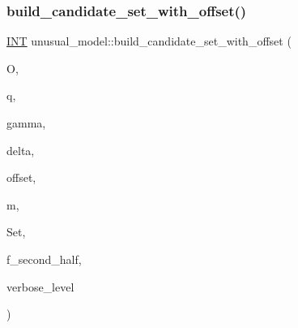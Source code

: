 \subsubsection{\texorpdfstring{build\+\_\+candidate\+\_\+set\+\_\+with\+\_\+offset()}{build\_candidate\_set\_with\_offset()}}
{\footnotesize\ttfamily \mbox{\hyperlink{galois_8h_a09fddde158a3a20bd2dcadb609de11dc}{I\+NT}} unusual\+\_\+model\+::build\+\_\+candidate\+\_\+set\+\_\+with\+\_\+offset (\begin{DoxyParamCaption}\item[{\mbox{\hyperlink{classorthogonal}{orthogonal}} \&}]{O,  }\item[{\mbox{\hyperlink{galois_8h_a09fddde158a3a20bd2dcadb609de11dc}{I\+NT}}}]{q,  }\item[{\mbox{\hyperlink{galois_8h_a09fddde158a3a20bd2dcadb609de11dc}{I\+NT}}}]{gamma,  }\item[{\mbox{\hyperlink{galois_8h_a09fddde158a3a20bd2dcadb609de11dc}{I\+NT}}}]{delta,  }\item[{\mbox{\hyperlink{galois_8h_a09fddde158a3a20bd2dcadb609de11dc}{I\+NT}}}]{offset,  }\item[{\mbox{\hyperlink{galois_8h_a09fddde158a3a20bd2dcadb609de11dc}{I\+NT}}}]{m,  }\item[{\mbox{\hyperlink{galois_8h_a09fddde158a3a20bd2dcadb609de11dc}{I\+NT}} $\ast$}]{Set,  }\item[{\mbox{\hyperlink{galois_8h_a09fddde158a3a20bd2dcadb609de11dc}{I\+NT}}}]{f\+\_\+second\+\_\+half,  }\item[{\mbox{\hyperlink{galois_8h_a09fddde158a3a20bd2dcadb609de11dc}{I\+NT}}}]{verbose\+\_\+level }\end{DoxyParamCaption})}

\mbox{\label{classunusual__model_af9f81c8bc1fd1ced071441784848e988}} 
